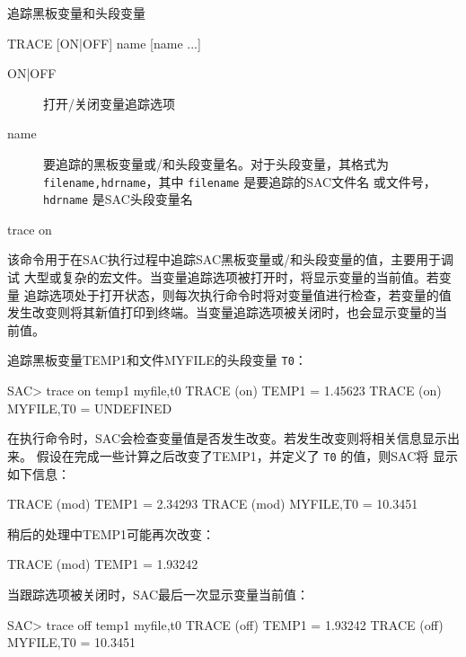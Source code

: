 \label{cmd:trace}

追踪黑板变量和头段变量

\begin{SACSTX}
TRACE [ON|OFF] name [name ...]
\end{SACSTX}

\begin{description}
\item [ON|OFF] 打开/关闭变量追踪选项
\item [name] 要追踪的黑板变量或/和头段变量名。对于头段变量，其格式为
    \texttt{filename,hdrname}，其中 \texttt{filename} 是要追踪的SAC文件名
    或文件号，\texttt{hdrname} 是SAC头段变量名
\end{description}

\begin{SACDFT}
trace on
\end{SACDFT}

该命令用于在SAC执行过程中追踪SAC黑板变量或/和头段变量的值，主要用于调试
大型或复杂的宏文件。当变量追踪选项被打开时，将显示变量的当前值。若变量
追踪选项处于打开状态，则每次执行命令时将对变量值进行检查，若变量的值
发生改变则将其新值打印到终端。当变量追踪选项被关闭时，也会显示变量的当
前值。

追踪黑板变量TEMP1和文件MYFILE的头段变量 \texttt{T0}：
\begin{SACCode}
SAC> trace on temp1 myfile,t0
  TRACE  (on) TEMP1 = 1.45623
  TRACE  (on) MYFILE,T0 = UNDEFINED
\end{SACCode}

在执行命令时，SAC会检查变量值是否发生改变。若发生改变则将相关信息显示出来。
假设在完成一些计算之后改变了TEMP1，并定义了 \texttt{T0} 的值，则SAC将
显示如下信息：
\begin{SACCode}
  TRACE (mod) TEMP1 = 2.34293
  TRACE (mod) MYFILE,T0 = 10.3451
\end{SACCode}

稍后的处理中TEMP1可能再次改变：
\begin{SACCode}
  TRACE (mod) TEMP1 = 1.93242
\end{SACCode}

当跟踪选项被关闭时，SAC最后一次显示变量当前值：
\begin{SACCode}
SAC> trace off temp1 myfile,t0
  TRACE (off) TEMP1 = 1.93242
  TRACE (off) MYFILE,T0 = 10.3451
\end{SACCode}

